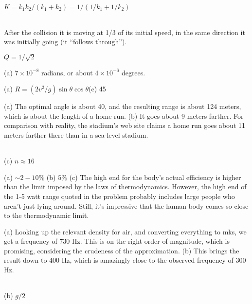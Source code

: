 \label{hwans:springsseries}
$K = k_1k_2/(k_1+k_2) = 1/(1/k_1+1/k_2)$

\noindent{}\\
\label{hwans:twotoonecollision}
After the collision it is moving at 1/3 of its initial speed, in the same direction
it was initially going (it ``follows through'').

\label{hwans:maxampatdc} $Q=1/\sqrt{2}$

\label{hwans:braginskii}
(a) $7\times10^{-8}$ radians, or about $4\times10^{-6}$ degrees.

\label{hwans:baseballrange}
(a) $R = (2v^2/g)\sin\theta\cos\theta$\quad (c) 45 \degunit


\label{hwans:baseballrangeair}
(a) The optimal angle is about 40\degunit, and the resulting range
is about 124 meters, which is about the length of a home run.
(b) It goes about 9 meters farther. For comparison with
reality, the stadium's web site claims a home run goes about 11 meters farther there
than in a sea-level stadium.

\noindent{}\\
\label{hwans:fluorocarbon} (c) $n\approx16$

\label{hwans:heart-efficiency}
(a) $\sim 2-10\%$ (b) $5\%$ (c) The high end for the body's
actual efficiency is higher than the limit imposed by the
laws of thermodynamics. However, the high end of the 1-5 watt range
quoted in the problem probably includes large people who aren't
just lying around. Still, it's impressive that the human body
comes so close to the thermodynamic limit.

\label{hwans:violin-helmholtz}
(a) Looking up the relevant density for air, and converting everything to mks,
we get a frequency of 730 Hz. This is on the right order of magnitude, which
is promising, considering the crudeness of the approximation.
(b) This brings the result down to 400 Hz, which is amazingly close to the
observed frequency of 300 Hz.

\noindent{}\\
\label{hwans:wave-on-hanging-string} (b) $g/2$


